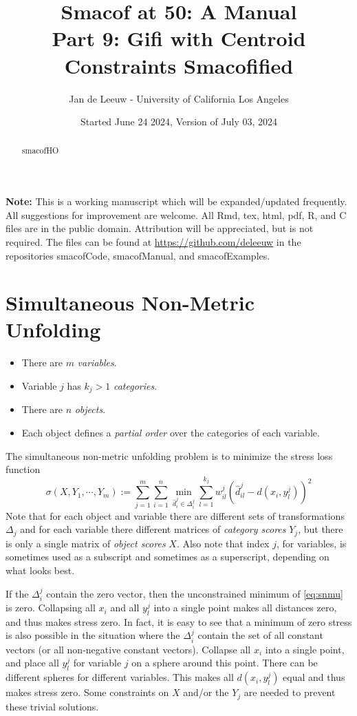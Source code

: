 \documentclass[
  12pt,
]{article}
\title{Smacof at 50: A Manual\\
Part 9: Gifi with Centroid Constraints Smacofified}
\author{Jan de Leeuw - University of California Los Angeles}
\date{Started June 24 2024, Version of July 03, 2024}
\providecommand{\tightlist}{%
  \setlength{\itemsep}{0pt}\setlength{\parskip}{0pt}}
\begin{document}
\maketitle
\begin{abstract}
smacofHO
\end{abstract}

{
\setcounter{tocdepth}{3}
\tableofcontents
}
\textbf{Note:} This is a working manuscript which will be expanded/updated
frequently. All suggestions for improvement are welcome. All Rmd, tex,
html, pdf, R, and C files are in the public domain. Attribution will be
appreciated, but is not required. The files can be found at
\url{https://github.com/deleeuw} in the repositories smacofCode, smacofManual,
and smacofExamples.

\section{Simultaneous Non-Metric Unfolding}\label{snmu}

\begin{itemize}
\tightlist
\item
  There are \(m\) \emph{variables}.
\item
  Variable \(j\) has \(k_j>1\) \emph{categories}.
\item
  There are \(n\) \emph{objects}.
\item
  Each object defines a \emph{partial order} over the categories of each variable.
\end{itemize}

The simultaneous non-metric unfolding problem is to minimize the stress loss function
\begin{equation}
\sigma(X,Y_1,\cdots,Y_m):=\sum_{j=1}^m\sum_{i=1}^n\min_{\hat d_i^j\in\Delta_i^j}\sum_{l=1}^{k_j}w_{il}^j(\hat d_{il}^j-d(x_i,y_l^j))^2
\label{eq:snmu}
\end{equation}
Note that for each object and variable there are different sets of transformations \(\Delta_j\)
and for each variable there different matrices of \emph{category scores} \(Y_j\), but there is only a single matrix of \emph{object scores} \(X\). Also note that index \(j\), for variables, is sometimes used as a subscript and sometimes as a superscript, depending on what looks best.

If the \(\Delta_i^j\) contain the zero vector, then the unconstrained minimum of \eqref{eq:snmu} is zero. Collapsing all \(x_i\) and all \(y_l^j\) into a single point makes all distances zero, and thus makes stress zero. In fact, it is easy to see that a minimum of zero stress is also possible in the situation where the \(\Delta_i^j\) contain the set of all constant vectors (or all non-negative constant vectors). Collapse all
\(x_i\) into a single point, and place all \(y_l^j\) for variable \(j\) on a sphere around this point. There can be different spheres for different variables. This makes all \(d(x_i,y_l^j)\) equal and thus makes stress zero. Some constraints on \(X\) and/or the \(Y_j\) are needed to prevent these trivial solutions.
\end{document}
